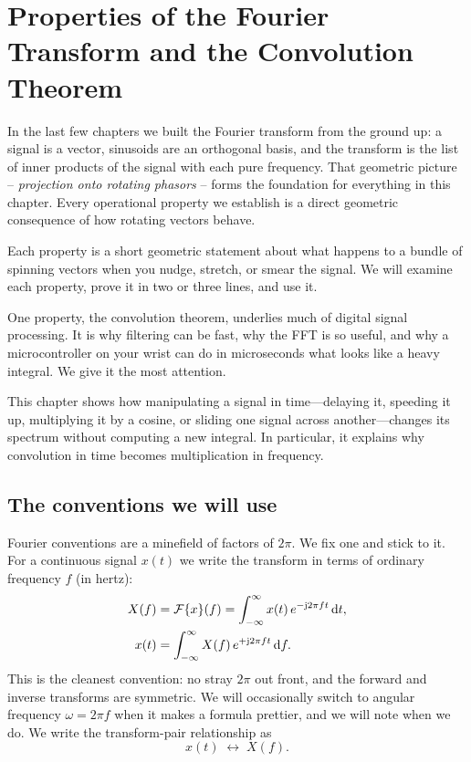 \chapter{Properties of the Fourier Transform and the Convolution Theorem}

In the last few chapters we built the Fourier transform from the ground up: a
signal is a vector, sinusoids are an orthogonal basis, and the transform is
the list of inner products of the signal with each pure
frequency. That geometric picture -- \emph{projection onto rotating phasors} --
forms the foundation for everything in this chapter. Every operational property
we establish is a direct geometric consequence of how rotating vectors behave.

Each property is a short geometric statement about what happens to a bundle of spinning vectors when you nudge, stretch, or smear the signal. We will examine each property, prove it in two or three lines, and use it.

One property, the convolution theorem, underlies much of digital signal
processing. It is why filtering can be fast, why the FFT is so useful, and why a
microcontroller on your wrist can do in microseconds what looks like a heavy
integral. We give it the most attention.

\begin{focusbox}
This chapter shows how manipulating a signal in time---delaying it, speeding it up, multiplying it by a cosine, or sliding one signal across another---changes its spectrum without computing a new integral. In particular, it explains why convolution in time becomes multiplication in frequency.
\end{focusbox}

\section{The conventions we will use}
\label{ch11:conventions}

Fourier conventions are a minefield of factors of $2\pi$. We fix one and stick
to it. For a continuous signal $x(t)$ we write the transform in terms of
ordinary frequency $f$ (in hertz):
\begin{align}
X(f) &= \mathcal{F}\{x\}(f) = \int_{-\infty}^{\infty} x(t)\, e^{-\mathrm{j} 2\pi f t}\, \mathrm{d} t,
\label{ch11:ft-fwd}\\
x(t) &= \int_{-\infty}^{\infty} X(f)\, e^{+\mathrm{j} 2\pi f t}\, \mathrm{d} f.
\label{ch11:ft-inv}
\end{align}
This is the cleanest convention: no stray $2\pi$ out front, and the forward and
inverse transforms are symmetric. We will occasionally switch to angular
frequency $\omega = 2\pi f$ when it makes a formula prettier, and we will note
when we do. We write the transform-pair relationship as
\[
x(t) \;\longleftrightarrow\; X(f).
\]

